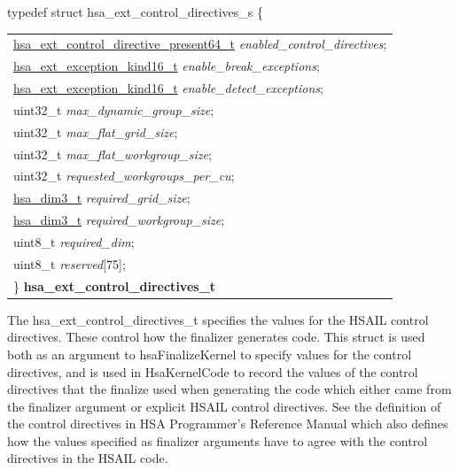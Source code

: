 \documentclass[final]{book}
\newcommand{\reffld}[1]{\textit{#1}}
\begin{document}
\noindent\begin{tcolorbox}[breakable,nobeforeafter,arc=0mm,colframe=white,colback=lightgray,left=0mm]
typedef struct  hsa_ext_control_directives_s \{
\vspace{-3.5mm}\begin{longtable}{@{}p{\textwidth}}
\hspace{1.7em}\hyperlink{group__FinalizerCoreApi_1ga366dea916dc7cec2954369e132e395e3}{hsa_ext_control_directive_present64_t} \reffld{enabled_control_directives};\\
\hspace{1.7em}\hyperlink{group__FinalizerCoreApi_1gaf05e7b6c47e7baac1cc9fb203047f168}{hsa_ext_exception_kind16_t} \reffld{enable_break_exceptions};\\
\hspace{1.7em}\hyperlink{group__FinalizerCoreApi_1gaf05e7b6c47e7baac1cc9fb203047f168}{hsa_ext_exception_kind16_t} \reffld{enable_detect_exceptions};\\
\hspace{1.7em}uint32_t \reffld{max_dynamic_group_size};\\
\hspace{1.7em}uint32_t \reffld{max_flat_grid_size};\\
\hspace{1.7em}uint32_t \reffld{max_flat_workgroup_size};\\
\hspace{1.7em}uint32_t \reffld{requested_workgroups_per_cu};\\
\hspace{1.7em}\hyperlink{group__RuntimeCommon_1ga6f7883588491965c45382cd996351aa2}{hsa_dim3_t} \reffld{required_grid_size};\\
\hspace{1.7em}\hyperlink{group__RuntimeCommon_1ga6f7883588491965c45382cd996351aa2}{hsa_dim3_t} \reffld{required_workgroup_size};\\
\hspace{1.7em}uint8_t \reffld{required_dim};\\
\hspace{1.7em}uint8_t \reffld{reserved}[75];\\
\}  \hypertarget{group__FinalizerCoreApi_1ga40c83573be6c1e21ad46ff8a7edd21b0}{\textbf{hsa_ext_control_directives_t}}
\end{longtable}

\end{tcolorbox}
The hsa_ext_control_directives_t specifies the values for the HSAIL control directives. These control how the finalizer generates code. This struct is used both as an argument to hsaFinalizeKernel to specify values for the control directives, and is used in HsaKernelCode to record the values of the control directives that the finalize used when generating the code which either came from the finalizer argument or explicit HSAIL control directives. See the definition of the control directives in HSA Programmer's Reference Manual which also defines how the values specified as finalizer arguments have to agree with the control directives in the HSAIL code.
\end{document}
